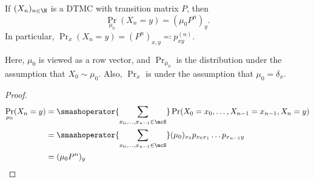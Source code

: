 \begin{theorem*}
    If $(X_n)_{n \in \N}$ is a DTMC with transition matrix $P$, then \[
        \Pr_{\mu_0}(X_n = y) = (\mu_0 P^n)_y.
    \] In particular, $\Pr_x(X_n = y) = (P^n)_{x,y} \eqcolon p_{xy}^{(n)}$.
\end{theorem*}
Here, $\mu_0$ is viewed as a row vector, and $\Pr_{\mu_0}$ is the distribution
under the assumption that $X_0 \sim \mu_0$.
Also, $\Pr_x$ is under the assumption that $\mu_0 = \delta_x$.
\begin{proof}
    \begin{align*}
        \Pr_{\mu_0}(X_n = y)
            &= \smashoperator{\sum_{x_0, \dots, x_{n-1} \in \mcS}}
                \Pr(X_0 = x_0, \dots, X_{n-1} = x_{n-1}, X_n = y) \\
            &= \smashoperator{\sum_{x_0, \dots, x_{n-1} \in \mcS}}
                (\mu_0)_{x_0} p_{x_0 x_1} \dots p_{x_{n-1} y} \\
            &= (\mu_0 P^n)_y \qedhere
    \end{align*}
\end{proof}

